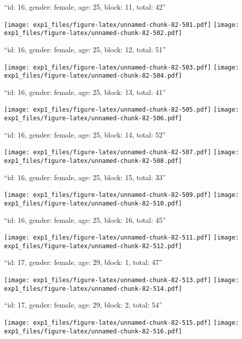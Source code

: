 \documentclass[11pt,,]{article}
\begin{document}
\newpage
[1] 

``id: 16, gender: female, age: 25, block: 11, total: 42''

\texttt{[image: exp1\_files/figure-latex/unnamed-chunk-82-501.pdf]}
\texttt{[image: exp1\_files/figure-latex/unnamed-chunk-82-502.pdf]}

\newpage
[1] 

``id: 16, gender: female, age: 25, block: 12, total: 51''

\texttt{[image: exp1\_files/figure-latex/unnamed-chunk-82-503.pdf]}
\texttt{[image: exp1\_files/figure-latex/unnamed-chunk-82-504.pdf]}

\newpage
[1] 

``id: 16, gender: female, age: 25, block: 13, total: 41''

\texttt{[image: exp1\_files/figure-latex/unnamed-chunk-82-505.pdf]}
\texttt{[image: exp1\_files/figure-latex/unnamed-chunk-82-506.pdf]}

\newpage
[1] 

``id: 16, gender: female, age: 25, block: 14, total: 52''

\texttt{[image: exp1\_files/figure-latex/unnamed-chunk-82-507.pdf]}
\texttt{[image: exp1\_files/figure-latex/unnamed-chunk-82-508.pdf]}

\newpage
[1] 

``id: 16, gender: female, age: 25, block: 15, total: 33''

\texttt{[image: exp1\_files/figure-latex/unnamed-chunk-82-509.pdf]}
\texttt{[image: exp1\_files/figure-latex/unnamed-chunk-82-510.pdf]}

\newpage
[1] 

``id: 16, gender: female, age: 25, block: 16, total: 45''

\texttt{[image: exp1\_files/figure-latex/unnamed-chunk-82-511.pdf]}
\texttt{[image: exp1\_files/figure-latex/unnamed-chunk-82-512.pdf]}

\newpage
[1] 

``id: 17, gender: female, age: 29, block: 1, total: 47''

\texttt{[image: exp1\_files/figure-latex/unnamed-chunk-82-513.pdf]}
\texttt{[image: exp1\_files/figure-latex/unnamed-chunk-82-514.pdf]}

\newpage
[1] 

``id: 17, gender: female, age: 29, block: 2, total: 54''

\texttt{[image: exp1\_files/figure-latex/unnamed-chunk-82-515.pdf]}
\texttt{[image: exp1\_files/figure-latex/unnamed-chunk-82-516.pdf]}
\end{document}

